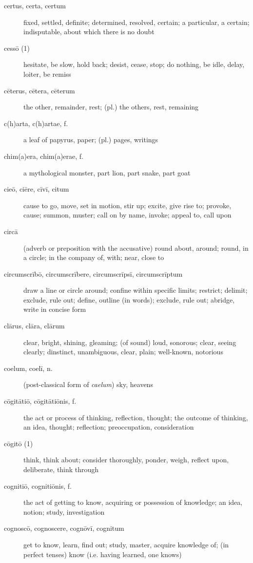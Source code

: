 \begin{description}
    \item[certus, certa, certum] \marginnote{*}fixed, settled, definite; determined, resolved, certain; a particular, a certain; indisputable, about which there is no doubt
    \item[cessō (1)] hesitate, be slow, hold back; desist, cease, stop; do nothing, be idle, delay, loiter, be remiss
    \item[cēterus, cētera, cēterum] \marginnote{*}the other, remainder, rest; (pl.) the others, rest, remaining
    \item[c(h)arta, c(h)artae, f.]  a leaf of papyrus, paper; (pl.) pages, writings
    \item[chim(a)era, chim(a)erae, f.] a mythological monster, part lion, part snake, part goat
    \item[cieō, ciēre, cīvī, citum] cause to go, move, set in motion, stir up; excite, give rise to; provoke, cause; summon, muster; call on by name, invoke; appeal to, call upon
    \item[circā] \marginnote{*}(adverb or preposition with the accusative) round about, around; round, in a circle; in the company of, with; near, close to
    \item[circumscrībō, circumscrībere, circumscrīpsī, circumscrīptum] draw a line or circle around; confine within specific limits; restrict; delimit; exclude, rule out; define, outline (in words); exclude, rule out; abridge, write in concise form
    \item[clārus, clāra, clārum] \marginnote{*}clear, bright, shining, gleaming; (of sound) loud, sonorous; clear, seeing clearly; dinstinct, unambiguous, clear, plain; well-known, notorious
    \item[coelum, coelī, n.] \marginnote{*}(post-classical form of \textit{caelum}) sky, heavens
    \item[cōgitātiō, cōgitātiōnis, f.] \marginnote{*}the act or process of thinking, reflection, thought; the outcome of thinking, an idea, thought; reflection; preoccupation, consideration
    \item[cōgitō (1)] \marginnote{*}think, think about; consider thoroughly, ponder, weigh, reflect upon, deliberate, think through
    \item[cognitiō, cognitiōnis, f.] \marginnote{*}the act of getting to know, acquiring or possession of knowledge; an idea, notion; study, investigation
    \item[cognoscō, cognoscere, cognōvī, cognitum] \marginnote{*}get to know, learn, find out; study, master, acquire knowledge of; (in perfect tenses) know (i.e. having learned, one knows)

\end{description}
